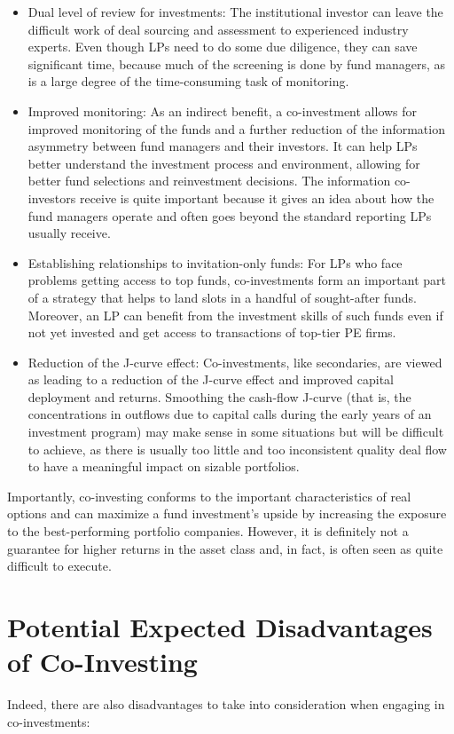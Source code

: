 \documentclass[11pt]{article}
\begin{document}
\begin{itemize}
  \item Dual level of review for investments: The institutional investor can leave the difficult work of deal sourcing and assessment to experienced industry experts. Even though LPs need to do some due diligence, they can save significant time, because much of the screening is done by fund managers, as is a large degree of the time-consuming task of monitoring.
  \item Improved monitoring: As an indirect benefit, a co-investment allows for improved monitoring of the funds and a further reduction of the information asymmetry between fund managers and their investors. It can help LPs better understand the investment process and environment, allowing for better fund selections and reinvestment decisions. The information co-investors receive is quite important because it gives an idea about how the fund managers operate and often goes beyond the standard reporting LPs usually receive.
  \item Establishing relationships to invitation-only funds: For LPs who face problems getting access to top funds, co-investments form an important part of a strategy that helps to land slots in a handful of sought-after funds. Moreover, an LP can benefit from the investment skills of such funds even if not yet invested and get access to transactions of top-tier PE firms.
  \item Reduction of the J-curve effect: Co-investments, like secondaries, are viewed as leading to a reduction of the J-curve effect and improved capital deployment and returns. Smoothing the cash-flow J-curve (that is, the concentrations in outflows due to capital calls during the early years of an investment program) may make sense in some situations but will be difficult to achieve, as there is usually too little and too inconsistent quality deal flow to have a meaningful impact on sizable portfolios.
\end{itemize}

Importantly, co-investing conforms to the important characteristics of real options and can maximize a fund investment's upside by increasing the exposure to the best-performing portfolio companies. However, it is definitely not a guarantee for higher returns in the asset class and, in fact, is often seen as quite difficult to execute.

\section*{Potential Expected Disadvantages of Co-Investing}
Indeed, there are also disadvantages to take into consideration when engaging in co-investments:
\end{document}
